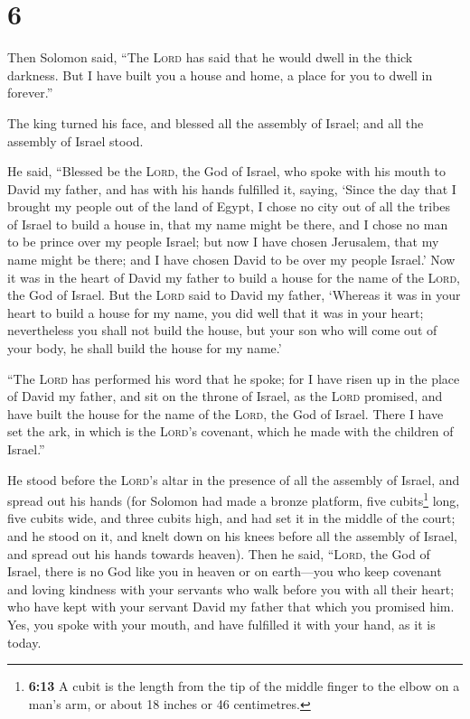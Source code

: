 \hypertarget{section-5}{%
\section{6}\label{section-5}}

 Then Solomon said, ``The \textsc{Lord} has said that he
would dwell in the thick darkness.  But I have built you a
house and home, a place for you to dwell in forever.''

 The king turned his face, and blessed all the assembly of
Israel; and all the assembly of Israel stood.

 He said, ``Blessed be the \textsc{Lord}, the God of
Israel, who spoke with his mouth to David my father, and has with his
hands fulfilled it, saying,  `Since the day that I brought
my people out of the land of Egypt, I chose no city out of all the
tribes of Israel to build a house in, that my name might be there, and I
chose no man to be prince over my people Israel;  but now
I have chosen Jerusalem, that my name might be there; and I have chosen
David to be over my people Israel.'  Now it was in the
heart of David my father to build a house for the name of the
\textsc{Lord}, the God of Israel.  But the \textsc{Lord}
said to David my father, `Whereas it was in your heart to build a house
for my name, you did well that it was in your heart; 
nevertheless you shall not build the house, but your son who will come
out of your body, he shall build the house for my name.'

 ``The \textsc{Lord} has performed his word that he
spoke; for I have risen up in the place of David my father, and sit on
the throne of Israel, as the \textsc{Lord} promised, and have built the
house for the name of the \textsc{Lord}, the God of Israel.
 There I have set the ark, in which is the
\textsc{Lord}'s covenant, which he made with the children of Israel.''

 He stood before the \textsc{Lord}'s altar in the
presence of all the assembly of Israel, and spread out his hands
 (for Solomon had made a bronze platform, five
cubits\footnote{\textbf{6:13} A cubit is the length from the tip of the
  middle finger to the elbow on a man's arm, or about 18 inches or 46
  centimetres.} long, five cubits wide, and three cubits high, and had
set it in the middle of the court; and he stood on it, and knelt down on
his knees before all the assembly of Israel, and spread out his hands
towards heaven).  Then he said, ``\textsc{Lord}, the God
of Israel, there is no God like you in heaven or on earth---you who keep
covenant and loving kindness with your servants who walk before you with
all their heart;  who have kept with your servant David
my father that which you promised him. Yes, you spoke with your mouth,
and have fulfilled it with your hand, as it is today.

